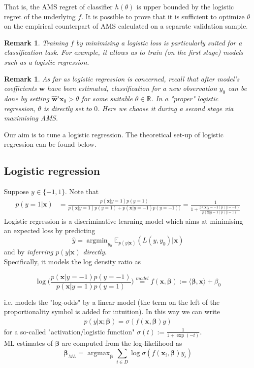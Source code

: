 \documentclass[]{article}
\newcommand{\x}{\mathbf{x}}
\newcommand{\bbeta}{\boldsymbol \beta}
\newtheorem{remark}[theorem]{Remark}
\begin{document}
That is, the AMS regret of classifier $h(\theta)$ is upper bounded by the logistic regret of the underlying $f$. It is possible to prove that it is sufficient to optimize $\theta$ on the empirical counterpart of AMS calculated on a separate validation sample. 


\begin{remark}
Training $f$ by minimising a logistic loss is particularly suited for a classification task. For example, it allows us to train (on the first stage) models such as a logistic regression. 
\end{remark}
\begin{remark}
As far as logistic regression is concerned, recall that after model's coefficients $\bm{w}$ have been estimated, classification for a new observation $y_0$ can be done by setting  $\hat{\bm{w}}'\bm{x}_0>\theta$ for some suitable $\theta \in \mathbb{R}$. In a "proper" logistic regression, $\theta$ is directly set to $0$. Here we choose it during a second stage via maximising AMS.
\end{remark}

Our aim is to tune a logistic regression. The theoretical set-up of logistic regression can be found below.

\subsection{Logistic regression}


Suppose $y\in \{-1,1\}$. Note that
\begin{align}
p(y=1|\x)&=\frac{p(\x|y=1)p(y=1)}{p(\x|y=1)p(y=1)+p(\x|y=-1)p(y=-1))} = \frac{1}{1+\frac{p(\x|y=-1)p(y=-1)}{p(\x|y=1)p(y=1)}}
\end{align}
Logistic regression is a discriminative learning model which aims at minimising an expected loss by predicting 
$$\hat{y}=\operatorname{argmin}_{y_0}\mathbb{E}_{p(y|\x)}(L(y,y_0)|\x)$$
and by \textit{inferring $p(y|\x)$ directly}. \\


Specifically, it models the log density ratio as 

$$\log\Big(\frac{p(\x|y=-1)p(y=-1)}{p(\x|y=1)p(y=1)}\Big)\overset{model}{=}f(\x,\bbeta):=\langle \bbeta,\x \rangle+\beta_0$$ 

i.e. models the "log-odds"  by a linear model (the term on the left of the proportionality symbol is added for intuition). In this way we can write 
\begin{align}
p(y|\x;\bbeta)=\sigma(f(\x,\bbeta)y)
\end{align}
for a so-called "activation/logistic function" $\sigma(t):=\frac{1}{1+\exp(-t)}$.  \\
ML estimates of $\bbeta$ are computed from the log-likelihood as $$\bbeta_{ML}=\operatorname{argmax}_{\bbeta}\sum_{i\in D}\log\sigma(f(\x_i,\bbeta)y_i)$$
\end{document}
